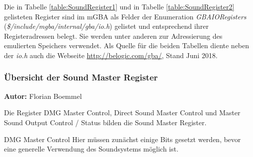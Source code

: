 \documentclass[11pt,a4paper]{scrartcl}
\newcommand{\AutorFlorian} {
    \vspace{-4mm}
    \large \textbf{Autor:} Florian Boemmel \normalsize
    \vspace{2mm}
}
\begin{document}
Die in Tabelle \ref{table:SoundRegister1} und in Tabelle \ref{table:SoundRegister2} gelisteten Register sind im mGBA als Felder der Enumeration \textit{GBAIORegisters} (\textit{\$/include/mgba/internal/gba/io.h}) gelistet und entsprechend ihrer Registeradressen belegt. Sie werden unter anderen zur Adressierung des emulierten Speichers verwendet. Als Quelle f\"ur die beiden Tabellen diente neben der \textit{io.h} auch die Webseite \url{http://belogic.com/gba/}, Stand Juni 2018.

\newpage


\subsubsection{\"Ubersicht der Sound Master Register}
\AutorFlorian

Die Register DMG Master Control, Direct Sound Master Control und Master Sound Output Control / Status bilden die Sound Master Register.

\vspace{5mm}
\large DMG Master Control \label{dmgmastercontrol}
\vspace{2mm}\newline
Hier m\"ussen zun\"achst einige Bits gesetzt werden, bevor eine generelle Verwendung des Soundsystems m\"oglich ist.
\end{document}
